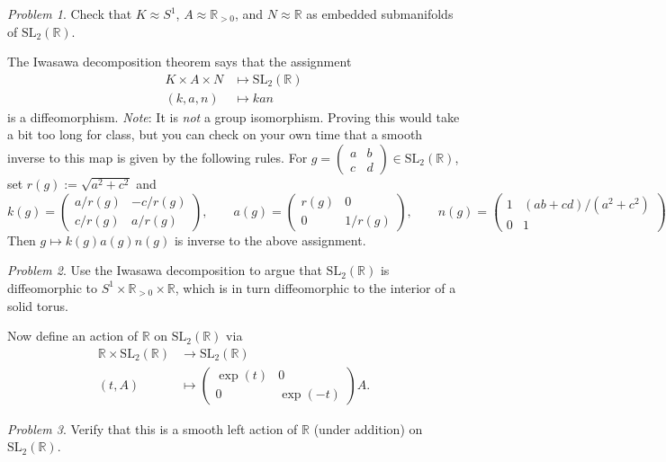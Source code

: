 \documentclass[11pt,twoside]{amsart}
\theoremstyle{plain}
\theoremstyle{remark}
\newtheorem{prob}{Problem}
\theoremstyle{definition}
\theoremstyle{definition}
\newcommand{\RR}{\mathbb{R}}
\newcommand{\SL}{\mathrm{SL}}
\begin{document}
\begin{prob}
Check that $K\approx S^1$, $A\approx \RR_{>0}$, and $N\approx \RR$ as embedded submanifolds of $\SL_2(\RR)$.
\end{prob}

The Iwasawa decomposition theorem says that the assignment
\[
\begin{aligned}
  K\times A\times N&\longmapsto \SL_2(\RR)\\
  (k,a,n)&\longmapsto kan
\end{aligned}
\]
is a diffeomorphism. \emph{Note}: It is \emph{not} a group isomorphism. Proving this would take a bit too long for class, but you can check on your own time that a smooth inverse to this map is given by the following rules. For $g = \begin{pmatrix}a&b\\c&d\end{pmatrix}\in \SL_2(\RR)$, set $r(g) := \sqrt{a^2+c^2}$ and
\[
  k(g) = \begin{pmatrix}
  a/r(g)& -c/r(g)\\ c/r(g)& a/r(g)
  \end{pmatrix},\qquad
  a(g) = \begin{pmatrix}
  r(g) & 0\\ 0& 1/r(g)
  \end{pmatrix},\qquad 
  n(g) = \begin{pmatrix}
  1 & (ab+cd)/(a^2+c^2)\\
  0& 1
  \end{pmatrix}.
\]
Then $g\mapsto k(g)a(g)n(g)$ is inverse to the above assignment.

\begin{prob}
Use the Iwasawa decomposition to argue that $\SL_2(\RR)$ is diffeomorphic to $S^1\times \RR_{>0}\times \RR$, which is in turn diffeomorphic to the interior of a solid torus.
\end{prob}

Now define an action of $\RR$ on $\SL_2(\RR)$ via
\[
\begin{aligned}
  \RR\times \SL_2(\RR)&\longrightarrow \SL_2(\RR)\\
  (t,A)&\longmapsto \begin{pmatrix}
  \exp(t)&0\\0&\exp(-t)
  \end{pmatrix}A.
\end{aligned}
\]

\begin{prob}
Verify that this is a smooth left action of $\RR$ (under addition) on $\SL_2(\RR)$.
\end{prob}
\end{document}
